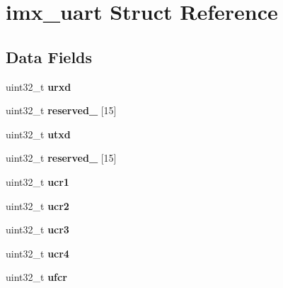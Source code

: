 \hypertarget{structimx__uart}{}\section{imx\+\_\+uart Struct Reference}
\label{structimx__uart}
\subsection*{Data Fields}
\begin{DoxyCompactItemize}
\item 
\mbox{\label{structimx__uart_a1cf7a1a83fc42234093aa5fdb279c07a}} 
uint32\+\_\+t {\bfseries urxd}
\item 
\mbox{\label{structimx__uart_a0ad98e17045309fe3d560ce7b481a719}} 
uint32\+\_\+t {\bfseries reserved\+\_} \mbox{[}15\mbox{]}
\item 
\mbox{\label{structimx__uart_a651f59c0c88b62412fc00207d9de7166}} 
uint32\+\_\+t {\bfseries utxd}
\item 
\mbox{\label{structimx__uart_a2de148b5e218edd39ee70af267021264}} 
uint32\+\_\+t {\bfseries reserved\+\_} \mbox{[}15\mbox{]}
\item 
\mbox{\label{structimx__uart_a117cbb0ac89cd697275ccb279cadd380}} 
uint32\+\_\+t {\bfseries ucr1}
\item 
\mbox{\label{structimx__uart_a64ad97699948c20676838dc8e9a0d387}} 
uint32\+\_\+t {\bfseries ucr2}
\item 
\mbox{\label{structimx__uart_a4121f5f3b84c4939c5295272d3e1888c}} 
uint32\+\_\+t {\bfseries ucr3}
\item 
\mbox{\label{structimx__uart_a2cc89b3f255c49bb88f8c3c64e8d7ca6}} 
uint32\+\_\+t {\bfseries ucr4}
\item 
\mbox{\label{structimx__uart_a9dc92fc1c958a62a8b9555d3b45ee8f0}} 
uint32\+\_\+t {\bfseries ufcr}
\item 
\mbox{\label{structimx__uart_aefbceb6504379ca57785f81470962201}} 

\end{DoxyCompactItemize}
